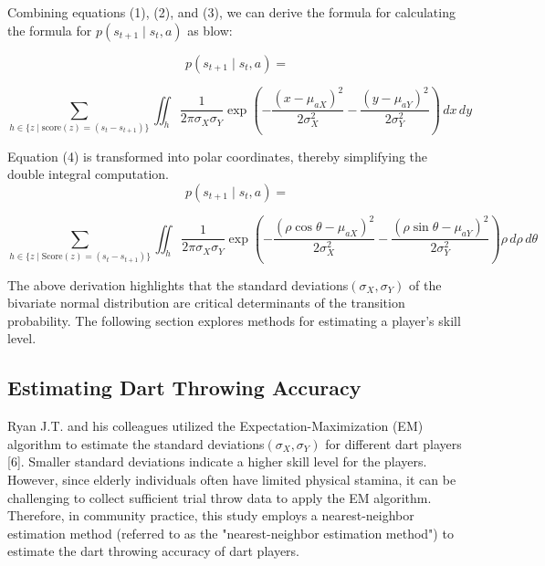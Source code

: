\documentclass[cjjs]{ipart}
\theoremstyle{plain}
\begin{document}
Combining equations (1), (2), and (3), we can derive the formula for calculating the formula for $p(s_{t+1} \mid s_t, a)$ as blow:

\[
p(s_{t+1} \mid s_t, a)=
\]

\begin{equation}
\sum_{h \in \{ z \mid \text{score}(z) = (s_t - s_{t+1}) \}} \iint_h \frac{1}{2 \pi \sigma_X \sigma_Y} \exp \left( - \frac{(x - \mu_{aX})^2}{2 \sigma_X^2} - \frac{(y - \mu_{aY})^2}{2 \sigma_Y^2} \right) \, dx\,dy \tag{4}
\end{equation}

Equation (4) is transformed into polar coordinates, thereby simplifying the double integral computation.
\[
p(s_{t+1} \mid s_t, a) =
\]

\begin{equation}
\sum_{h \in \{ z \mid \text{Score}(z) = (s_t - s_{t+1}) \}} \iint_h \frac{1}{2 \pi \sigma_X \sigma_Y} \exp \left( - \frac{(\rho \cos \theta - \mu_{aX})^2}{2 \sigma_X^2} - \frac{(\rho \sin \theta - \mu_{aY})^2}{2 \sigma_Y^2} \right) \rho \, d\rho \, d\theta\tag{5}
\end{equation}

The above derivation highlights that the standard deviations$(\sigma_X, \sigma_Y)$ of the bivariate normal distribution are critical determinants of the transition probability. The following section explores methods for estimating a player's skill level.

\subsection{Estimating Dart Throwing Accuracy}

Ryan J.T. and his colleagues utilized the Expectation-Maximization (EM) algorithm to estimate the standard deviations$(\sigma_X, \sigma_Y)$ for different dart players [6]. Smaller standard deviations indicate a higher skill level for the players. However, since elderly individuals often have limited physical stamina, it can be challenging to collect sufficient trial throw data to apply the EM algorithm. Therefore, in community practice, this study employs a nearest-neighbor estimation method (referred to as the "nearest-neighbor estimation method") to estimate the dart throwing accuracy of dart players.
\end{document}
